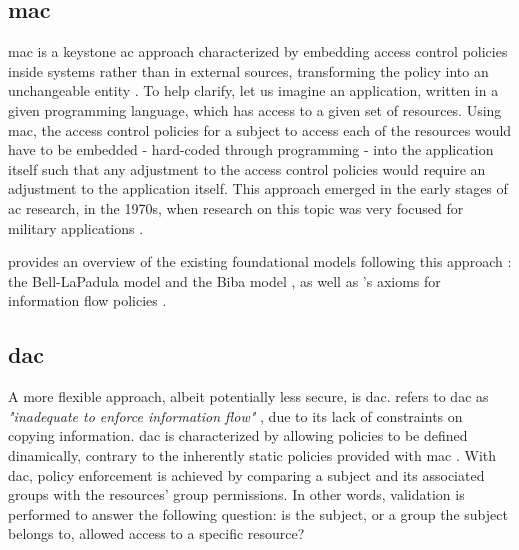 \subsection{\glsdesc{mac}}

\glsdesc{mac} is a keystone \gls{ac} approach characterized by embedding access control policies inside systems rather than in external sources, transforming the policy into an unchangeable entity \cite[23]{biba_integrity_1977}. To help clarify, let us imagine an application, written in a given programming language, which has access to a given set of resources. Using \gls{mac}, the access control policies for a subject to access each of the resources would have to be embedded - hard-coded through programming - into the application itself such that any adjustment to the access control policies would require an adjustment to the application itself. This approach emerged in the early stages of \gls{ac} research, in the 1970s, when research on this topic was very focused for military applications \cite{sandhu_lattice-based_1993}.

\citeauthor{sandhu_lattice-based_1993} provides an overview of the existing foundational models following this approach \cite{sandhu_lattice-based_1993}: the Bell-LaPadula model \cite{bell_secure_1973} and the Biba model \cite{biba_integrity_1977}, as well as \citeauthor{denning_lattice_1976}'s axioms for information flow policies \cite{denning_lattice_1976}.

\subsection{\glsdesc{dac}}

A more flexible approach, albeit potentially less secure, is \glsdesc{dac}. \citeauthor{sandhu_lattice-based_1993} refers to \gls{dac} as \emph{"inadequate to enforce information flow"} \cite[8]{sandhu_lattice-based_1993}, due to its lack of constraints on copying information. \gls{dac} is characterized by allowing policies to be defined dinamically, contrary to the inherently static policies provided with \gls{mac} \cite[23]{biba_integrity_1977}. With \gls{dac}, policy enforcement is achieved by comparing a subject and its associated groups with the resources’ group permissions. In other words, validation is performed to answer the following question: is the subject, or a group the subject belongs to, allowed access to a specific resource?

